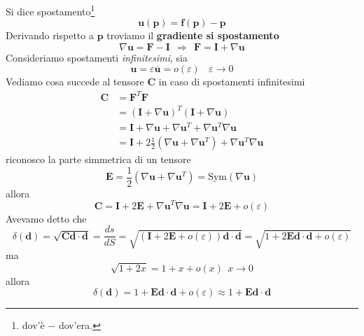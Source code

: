 \documentclass[10pt,a4paper,twoside]{book}
\begin{document}
Si dice spostamento\footnote{dov'è $-$ dov'era.}
\begin{equation*}
\mathbf{u}(\mathbf{p}) =\mathbf{f}(\mathbf{p}) -\mathbf{p}
\end{equation*}
Derivando rispetto a $\mathbf{p}$ troviamo il \textbf{gradiente si spostamento}
\begin{equation*}
\boxed{\nabla \mathbf{u} =\mathbf{F} -\mathbf{I}} \ \ \Rightarrow \ \ \mathbf{F} =\mathbf{I} +\nabla \mathbf{u}
\end{equation*}
Consideriamo spostamenti \textit{infinitesimi}, sia
\begin{equation*}
\mathbf{u} =\varepsilon \overline{\mathbf{u}} =o( \varepsilon ) \ \ \ \ \varepsilon \rightarrow 0
\end{equation*}
Vediamo cosa succede al tensore $\mathbf{C}$ in caso di spostamenti infinitesimi
\begin{equation*}
\begin{aligned}
\mathbf{C} & =\mathbf{F}^{T}\mathbf{F}\\
 & =(\mathbf{I} +\nabla \mathbf{u})^{T}(\mathbf{I} +\nabla \mathbf{u})\\
 & =\mathbf{I} +\nabla \mathbf{u} +\nabla \mathbf{u}^{T} +\nabla \mathbf{u}^{T} \nabla \mathbf{u}\\
 & =\mathbf{I} +2\frac{1}{2}\left( \nabla \mathbf{u} +\nabla \mathbf{u}^{T}\right) +\nabla \mathbf{u}^{T} \nabla \mathbf{u}
\end{aligned}
\end{equation*}
riconosco la parte simmetrica di un tensore
\begin{equation*}
\boxed{\mathbf{E} =\frac{1}{2}\left( \nabla \mathbf{u} +\nabla \mathbf{u}^{T}\right) =\mathrm{Sym}( \nabla \mathbf{u})}
\end{equation*}
allora
\begin{equation*}
\mathbf{C} =\mathbf{I} +2\mathbf{E} +\nabla \mathbf{u}^{T} \nabla \mathbf{u} =\mathbf{I} +2\mathbf{E} +o( \varepsilon )
\end{equation*}
Avevamo detto che
\begin{equation*}
\delta (\mathbf{d}) =\sqrt{\mathbf{Cd} \cdotp \mathbf{d}} =\frac{ds}{dS} =\sqrt{(\mathbf{I} +2\mathbf{E} +o( \varepsilon ))\mathbf{d} \cdotp \mathbf{d}} =\sqrt{1+2\mathbf{Ed} \cdotp \mathbf{d} +o( \varepsilon )}
\end{equation*}
ma
\begin{equation*}
\sqrt{1+2x} =1+x+o( x) \ \ x\rightarrow 0
\end{equation*}
allora
\begin{equation*}
\delta (\mathbf{d}) =1+\mathbf{Ed} \cdotp \mathbf{d} +o( \varepsilon ) \approx 1+\mathbf{Ed} \cdotp \mathbf{d}
\end{equation*}
\end{document}

